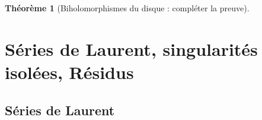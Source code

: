 \documentclass[11pt,a4paper]{book}
\theoremstyle{definition}
\newtheorem{theoreme}{Th\'eor\`eme}[section]
\theoremstyle{plain}
\begin{document}
\begin{theoreme}[Biholomorphismes du disque : compléter la preuve]
\end{theoreme}


%
%
%
%
%
%
%
%
%
%
%








\chapter{Séries de Laurent, singularités isolées, Résidus}

\section{Séries de Laurent}
\end{document}
